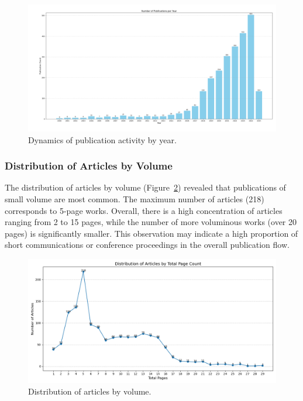 \begin{figure}[H]
\centering
\includegraphics[width=\textwidth]{Src/images/Years.png}
\caption{Dynamics of publication activity by year.}
\label{fig:years_png}
\end{figure}

\subsubsection*{Distribution of Articles by Volume}
The distribution of articles by volume (Figure~\ref{fig:article_png}) revealed that publications of small volume are most common. The maximum number of articles (218) corresponds to 5-page works. Overall, there is a high concentration of articles ranging from 2 to 15 pages, while the number of more voluminous works (over 20 pages) is significantly smaller. This observation may indicate a high proportion of short communications or conference proceedings in the overall publication flow.

\begin{figure}[H]
\centering
\includegraphics[width=1\textwidth]{Src/images/Article.png}
\caption{Distribution of articles by volume.}
\label{fig:article_png}
\end{figure}

